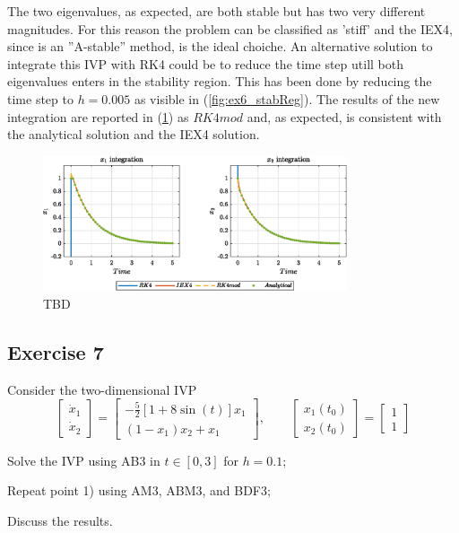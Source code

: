 \documentclass[11pt,a4paper,oneside]{article}
\begin{document}
The two eigenvalues, as expected, are both stable but has two very different magnitudes.
For this reason the problem can be classified as 'stiff' and the IEX4, since is an ''A-stable'' method, is the ideal choiche.
An alternative solution to integrate this IVP with RK4 could be to reduce the time step utill both eigenvalues enters in the stability region.
This has been done by reducing the time step to $h=0.005$ as visible in (\cref{fig:ex6_stabReg}).
The results of the new integration are reported in (\cref{fig:ex6_integrationMod}) as $RK4mod$ and, as expected, is consistent with the analytical solution and the IEX4 solution.
\begin{figure}[htb]
    \centering
    \includegraphics*[width=0.8\textwidth, keepaspectratio]{ex6_integOutputMod.eps}
    \caption[]{\label{fig:ex6_integrationMod} TBD}
\end{figure}


\clearpage
\subsection*{Exercise 7}

Consider the two-dimensional IVP 
$$\begin{bmatrix}\dot{x}_1 \\ \dot{x}_2\end{bmatrix}=\begin{bmatrix}-\frac{5}{2}\left[1+8\sin(t)\right]x_1 \\ (1-x_1)x_2+x_1\end{bmatrix}, \qquad \begin{bmatrix} x_1(t_0)\\ x_2(t_0)\end{bmatrix}=\begin{bmatrix} 1\\ 1\end{bmatrix}$$
\begin{enumerate*}[label=\arabic*)]
    \item Solve the IVP using AB3 in $t\in[0,3]$ for $h=0.1$;
    \item Repeat point 1) using AM3, ABM3, and BDF3;
    \item Discuss the results.
\end{enumerate*}
\end{document}
